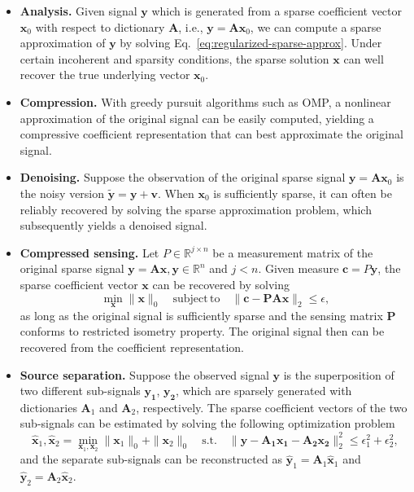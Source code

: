 \begin{itemize}

\item \textbf{Analysis.} Given signal $\mathbf{y}$ which is generated from a sparse
coefficient vector $\mathbf{x}_0$ with respect to dictionary $\mathbf{A}$, i.e.,
$\mathbf{y}=\mathbf{A}\mathbf{x}_0$, we can compute a sparse approximation of
$\mathbf{y}$ by solving Eq.~\ref{eq:regularized-sparse-approx}. Under certain
incoherent and sparsity conditions, the sparse solution $\mathbf{x}$ can well
recover the true underlying vector $\mathbf{x}_0$.

\item \textbf{Compression.} With greedy pursuit algorithms such as OMP, a
 nonlinear approximation of the original signal can be easily
 computed, yielding a compressive coefficient representation that can best
 approximate the original signal.

\item \textbf{Denoising.} Suppose the observation of the original sparse
signal $\mathbf{y}=\mathbf{A}\mathbf{x}_0$ is the noisy version $\mathbf{\tilde{y}}=\mathbf{y}+\mathbf{v}$.
When $\mathbf{x}_0$ is sufficiently sparse, it can often be reliably recovered
by solving the sparse approximation problem, which subsequently yields a
denoised signal.

\item \textbf{Compressed sensing.} Let $P\in\mathbb{R}^{j\times n}$ be a
measurement matrix of the original sparse signal
$\mathbf{y}=\mathbf{A}\mathbf{x}, \mathbf{y}\in\mathbb{R}^n$
and $j < n$. Given measure $\mathbf{c}=P\mathbf{y}$, the sparse coefficient vector
$\mathbf{x}$ can be recovered by solving
\begin{equation}
\min_\mathbf{x} \|\mathbf{x}\|_0 \quad \mathrm{subject\,to} \quad \|\mathbf{c}-\mathbf{P}\mathbf{A}\mathbf{x}\|_2 \leq \epsilon,
\end{equation}
as long as the original signal is sufficiently sparse and the sensing matrix $\mathbf{P}$ conforms to restricted isometry property.
The original signal then can be recovered from the coefficient representation.

\item \textbf{Source separation.} Suppose the observed signal $\mathbf{y}$ is the superposition of
two different sub-signals $\mathbf{y_1}$, $\mathbf{y_2}$, which are sparsely generated with dictionaries
$\mathbf{A}_1$ and $\mathbf{A}_2$, respectively. The sparse coefficient vectors of the two sub-signals
can be estimated by solving the following optimization problem
\begin{equation}
\hat{\mathbf{x}}_1,\hat{\mathbf{x}}_2 = \min_{\mathbf{x}_1,\mathbf{x}_2} \|\mathbf{x}_1\|_0 + \|\mathbf{x}_2\|_0 \quad \mathrm{s.t.} \quad \|\mathbf{y}-\mathbf{A_1 x_1} - \mathbf{A_2 x_2}\|_2^2 \leq \epsilon_1^2 + \epsilon_2^2,
\end{equation}
and the separate sub-signals can be reconstructed as $\hat{\mathbf{y}}_1=\mathbf{A}_1\hat{\mathbf{x}}_1$ and $\hat{\mathbf{y}}_2=\mathbf{A}_2\hat{\mathbf{x}}_2$.

\end{itemize}


